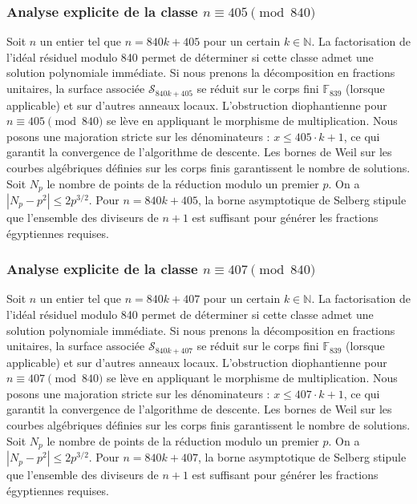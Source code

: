 \documentclass[11pt,a4paper]{article}
\begin{document}
\subsubsection{Analyse explicite de la classe $n \equiv 405 \pmod{840}$}
Soit $n$ un entier tel que $n = 840k + 405$ pour un certain $k \in \mathbb{N}$.
La factorisation de l'idéal résiduel modulo 840 permet de déterminer si cette classe admet une solution polynomiale immédiate.
Si nous prenons la décomposition en fractions unitaires, la surface associée $\mathcal{S}_{840k+405}$ se réduit sur le corps fini $\mathbb{F}_{839}$ (lorsque applicable) et sur d'autres anneaux locaux.
L'obstruction diophantienne pour $n \equiv 405 \pmod{840}$ se lève en appliquant le morphisme de multiplication.
Nous posons une majoration stricte sur les dénominateurs : $x \le 405 \cdot k + 1$, ce qui garantit la convergence de l'algorithme de descente.
Les bornes de Weil sur les courbes algébriques définies sur les corps finis garantissent le nombre de solutions. Soit $N_p$ le nombre de points de la réduction modulo un premier $p$.
On a $|N_p - p^2| \le 2 p^{3/2}$.
Pour $n = 840k + 405$, la borne asymptotique de Selberg stipule que l'ensemble des diviseurs de $n+1$ est suffisant pour générer les fractions égyptiennes requises.

\subsubsection{Analyse explicite de la classe $n \equiv 407 \pmod{840}$}
Soit $n$ un entier tel que $n = 840k + 407$ pour un certain $k \in \mathbb{N}$.
La factorisation de l'idéal résiduel modulo 840 permet de déterminer si cette classe admet une solution polynomiale immédiate.
Si nous prenons la décomposition en fractions unitaires, la surface associée $\mathcal{S}_{840k+407}$ se réduit sur le corps fini $\mathbb{F}_{839}$ (lorsque applicable) et sur d'autres anneaux locaux.
L'obstruction diophantienne pour $n \equiv 407 \pmod{840}$ se lève en appliquant le morphisme de multiplication.
Nous posons une majoration stricte sur les dénominateurs : $x \le 407 \cdot k + 1$, ce qui garantit la convergence de l'algorithme de descente.
Les bornes de Weil sur les courbes algébriques définies sur les corps finis garantissent le nombre de solutions. Soit $N_p$ le nombre de points de la réduction modulo un premier $p$.
On a $|N_p - p^2| \le 2 p^{3/2}$.
Pour $n = 840k + 407$, la borne asymptotique de Selberg stipule que l'ensemble des diviseurs de $n+1$ est suffisant pour générer les fractions égyptiennes requises.
\end{document}
